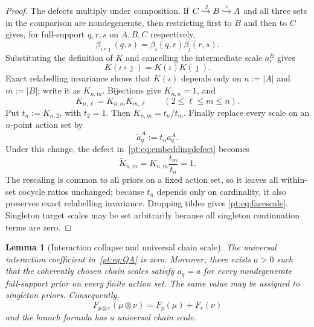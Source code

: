 \documentclass[11pt,a4paper]{article}
\newtheorem{lemma}[theorem]{Lemma}
\theoremstyle{definition}
\newcommand{\1}{\mathbf 1}
\begin{document}
\begin{proof}
The defects multiply under composition.  If
$C\xhookrightarrow{\jmath}B\xhookrightarrow{\iota}A$ and all three sets in the comparison are nondegenerate, then
restricting first to $B$ and then to $C$ gives, for full-support $q,r,s$ on $A,B,C$ respectively,
\[
\beta_{\iota\circ\jmath}(q,s)=\beta_\iota(q,r)\beta_\jmath(r,s).
\]
Substituting the definition of $K$ and cancelling the intermediate scale $a_r^B$ gives
\begin{equation}
K(\iota\circ\jmath)=K(\iota)K(\jmath).
\tag{KC}\label{pt:eq:embeddingcocycle}
\end{equation}
Exact relabelling invariance shows that $K(\iota)$ depends only on $n:=|A|$ and $m:=|B|$; write it as $K_{n,m}$.
Bijections give $K_{n,n}=1$, and
\[
K_{n,\ell}=K_{n,m}K_{m,\ell}
\qquad(2\le\ell\le m\le n).
\]
Put $t_n:=K_{n,2}$, with $t_2=1$.  Then $K_{n,m}=t_n/t_m$.  Finally replace every scale on an $n$-point action set by
\[
\widetilde a_q^A:=t_n a_q^A.
\]
Under this change, the defect in~\eqref{pt:eq:embeddingdefect} becomes
\[
\widetilde K_{n,m}=K_{n,m}\frac{t_m}{t_n}=1.
\]
The rescaling is common to all priors on a fixed action set, so it leaves all within-set cocycle ratios unchanged; because
$t_n$ depends only on cardinality, it also preserves exact relabelling invariance.  Dropping tildes gives
\eqref{pt:eq:facescale}.  Singleton target scales may be set arbitrarily because all singleton continuation terms are zero.
\end{proof}

\begin{lemma}[Interaction collapse and universal chain scale]\label{pt:lem:scalecoherence}
The universal interaction coefficient in~\eqref{pt:eq:QA} is zero.  Moreover, there exists $a>0$ such that the coherently
chosen chain scales satisfy $a_q=a$ for every nondegenerate full-support prior on every finite action set.  The same
value may be assigned to singleton priors.  Consequently,
\begin{equation}
F_{p\otimes r}(\mu\otimes\nu)=F_p(\mu)+F_r(\nu)
\tag{PA}\label{pt:eq:PArecovered}
\end{equation}
and the branch formula has a universal chain scale.
\end{lemma}
\end{document}
